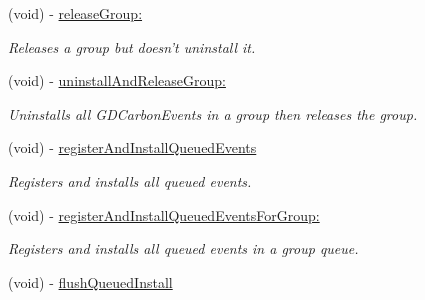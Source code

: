 \begin{DoxyCompactItemize}
(void) -\/ \hyperlink{interface_g_d_carbon_event_manager_a7959c7e44bc31f132278d2d5f10054cf}{releaseGroup:}
\begin{DoxyCompactList}\small\item\em Releases a group but doesn't uninstall it. \item\end{DoxyCompactList}\item 
\hypertarget{interface_g_d_carbon_event_manager_a55aff4d0cf08eecbf6cb5f85eb93993c}{
(void) -\/ \hyperlink{interface_g_d_carbon_event_manager_a55aff4d0cf08eecbf6cb5f85eb93993c}{uninstallAndReleaseGroup:}}
\label{interface_g_d_carbon_event_manager_a55aff4d0cf08eecbf6cb5f85eb93993c}

\begin{DoxyCompactList}\small\item\em Uninstalls all GDCarbonEvents in a group then releases the group. \item\end{DoxyCompactList}\item 
\hypertarget{interface_g_d_carbon_event_manager_a36c8cbdc86cd80d562aa1d2b9f528ae8}{
(void) -\/ \hyperlink{interface_g_d_carbon_event_manager_a36c8cbdc86cd80d562aa1d2b9f528ae8}{registerAndInstallQueuedEvents}}
\label{interface_g_d_carbon_event_manager_a36c8cbdc86cd80d562aa1d2b9f528ae8}

\begin{DoxyCompactList}\small\item\em Registers and installs all queued events. \item\end{DoxyCompactList}\item 
\hypertarget{interface_g_d_carbon_event_manager_a8257489f6076112b4aff9a656e28f083}{
(void) -\/ \hyperlink{interface_g_d_carbon_event_manager_a8257489f6076112b4aff9a656e28f083}{registerAndInstallQueuedEventsForGroup:}}
\label{interface_g_d_carbon_event_manager_a8257489f6076112b4aff9a656e28f083}

\begin{DoxyCompactList}\small\item\em Registers and installs all queued events in a group queue. \item\end{DoxyCompactList}\item 
\hypertarget{interface_g_d_carbon_event_manager_a54967798bd49ab40351020b72d9b5daf}{
(void) -\/ \hyperlink{interface_g_d_carbon_event_manager_a54967798bd49ab40351020b72d9b5daf}{flushQueuedInstall}}
\label{interface_g_d_carbon_event_manager_a54967798bd49ab40351020b72d9b5daf}


\end{DoxyCompactItemize}
